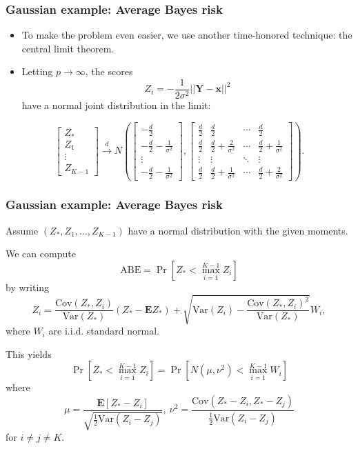 \documentclass{beamer}
\newcommand{\E}{\textbf{E}}
\newcommand{\Cov}{\text{Cov}}
\newcommand{\Var}{\text{Var}}
\newcommand{\bx}{\boldsymbol{x}}
\newcommand{\bY}{\boldsymbol{Y}}
\begin{document}
\begin{frame}
\frametitle{Gaussian example: Average Bayes risk}
\begin{itemize}
\item To make the problem even easier, we use another time-honored technique: the central limit theorem.
\item Letting $p \to \infty$, the scores
\[
Z_i = -\frac{1}{2\sigma^2} ||\bY - \bx||^2
\]
have a normal joint distribution in the limit:
\end{itemize}
\[
\begin{bmatrix}
Z_*\\
Z_1\\
\vdots\\
Z_{K-1}
\end{bmatrix} \stackrel{d}{\to} N\left(
\begin{bmatrix}
-\frac{d}{2}\\
-\frac{d}{2} - \frac{1}{\sigma^2}\\
\vdots\\
-\frac{d}{2} - \frac{1}{\sigma^2}
\end{bmatrix},
\begin{bmatrix}
\frac{d}{2} & \frac{d}{2} & \cdots & \frac{d}{2}\\
\frac{d}{2} & \frac{d}{2} + \frac{2}{\sigma^2} & \cdots & \frac{d}{2} + \frac{1}{\sigma^2}\\
\vdots & \vdots & \ddots & \vdots\\
\frac{d}{2} & \frac{d}{2} + \frac{1}{\sigma^2} & \cdots & \frac{d}{2} + \frac{2}{\sigma^2}
\end{bmatrix}
\right).
\]
\end{frame}

\begin{frame}
\frametitle{Gaussian example: Average Bayes risk}

Assume $(Z_*, Z_1,\hdots, Z_{K-1})$ have a normal distribution with the given moments.

We can compute
\[
\text{ABE} = \Pr[Z_* < \max_{i=1}^{K-1} Z_i]
\]
by writing
\[
Z_i = \frac{\Cov(Z_*, Z_i)}{\Var(Z_*)} (Z_* - \E Z_*) + \sqrt{\Var(Z_i) - \frac{\Cov(Z_*, Z_i)^2}{\Var(Z_*)}} W_i,
\]
where $W_i$ are i.i.d. standard normal.

This yields
\[
\Pr[Z_* < \max_{i=1}^{K-1} Z_i] = \Pr[N(\mu, \nu^2) < \max_{i=1}^{K-1} W_i]
\]
where
\[
\mu = \frac{\E[Z_* - Z_i]}{\sqrt{\frac{1}{2}\Var(Z_i - Z_j)}},\ \nu^2 = \frac{\Cov(Z_* - Z_i, Z_* - Z_j)}{\frac{1}{2}\Var(Z_i - Z_j)}
\]
for $i \neq j \neq K$.

\end{frame}
\end{document}
